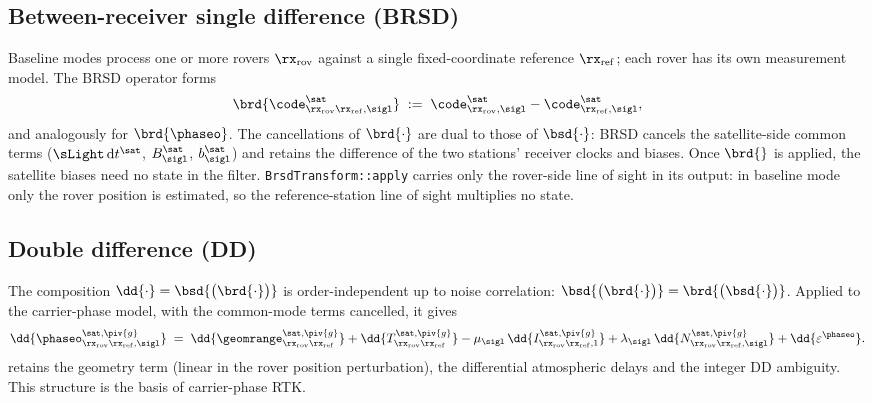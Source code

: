 \subsection{Between-receiver single difference (BRSD)}\label{sec:brsd}

Baseline modes process one or more rovers $\rx_{\mathrm{rov}}$ against a single
fixed-coordinate reference $\rx_{\mathrm{ref}}$; each rover has its own measurement
model.  The BRSD operator forms
\begin{equation}
\brd{\code^{\sat}_{\rx_{\mathrm{rov}}\rx_{\mathrm{ref}},\sigl}}
\;:=\;
\code^\sat_{\rx_{\mathrm{rov}},\sigl} - \code^\sat_{\rx_{\mathrm{ref}},\sigl},
\end{equation}
and analogously for $\brd{\phaseo}$.  The cancellations of $\brd{\cdot}$ are dual to
those of $\bsd{\cdot}$: BRSD cancels the satellite-side common terms
($\sLight\,\mathrm{d}t^\sat$, $B^\sat_\sigl$, $b^\sat_\sigl$) and retains the
difference of the two stations' receiver clocks and biases.  Once $\brd{}$ is
applied, the satellite biases need no state in the filter.  \texttt{BrsdTransform::apply} carries only
the rover-side line of sight in its output: in baseline mode only the rover position
is estimated, so the reference-station line of sight multiplies no state.

\subsection{Double difference (DD)}\label{sec:dd}

The composition $\dd{\cdot} = \bsd{\big(\brd{\cdot}\big)}$ is
order-independent up to noise correlation: $\bsd{\big(\brd{\cdot}\big)} = \brd{\big(\bsd{\cdot}\big)}$.
Applied to the carrier-phase model, with the common-mode terms cancelled, it gives
\begin{equation}
\dd{\phaseo^{\sat,\piv{g}}_{\rx_{\mathrm{rov}}\rx_{\mathrm{ref}},\sigl}}
\;=\;
\dd{\geomrange^{\sat,\piv{g}}_{\rx_{\mathrm{rov}}\rx_{\mathrm{ref}}}}
+ \dd{T^{\sat,\piv{g}}_{\rx_{\mathrm{rov}}\rx_{\mathrm{ref}}}}
- \mu_\sigl\,\dd{I^{\sat,\piv{g}}_{\rx_{\mathrm{rov}}\rx_{\mathrm{ref}},1}}
+ \lambda_\sigl\,\dd{N^{\sat,\piv{g}}_{\rx_{\mathrm{rov}}\rx_{\mathrm{ref}},\sigl}}
+ \dd{\varepsilon^\phaseo}.
\label{eq:dd-phase}
\end{equation}
 retains the geometry term (linear in the rover position
perturbation), the differential atmospheric delays and the integer DD ambiguity.
This structure is the basis of carrier-phase RTK.

